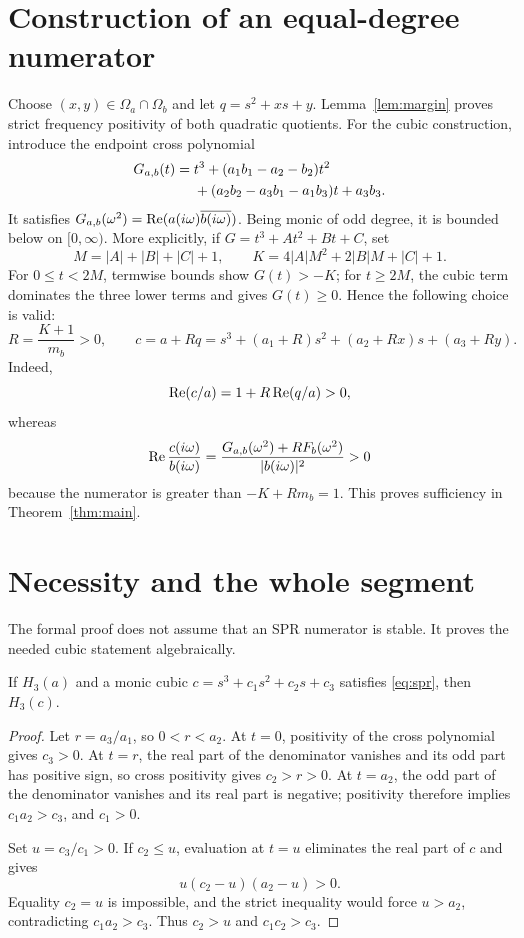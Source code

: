 \documentclass[11pt]{article}
\begin{document}
\section{Construction of an equal-degree numerator}
Choose $(x,y)\in\Omega_a\cap\Omega_b$ and let $q=s^2+xs+y$. Lemma~\ref{lem:margin} proves strict frequency positivity of both quadratic quotients. For the cubic construction, introduce the endpoint cross polynomial
\begin{align}
 G_{a,b}(t)={}&t^3+(a_1b_1-a_2-b_2)t^2\notag\\
 &+(a_2b_2-a_3b_1-a_1b_3)t+a_3b_3.
\end{align}
It satisfies $G_{a,b}(\omega^2)=\operatorname{Re}(a(i\omega)\overline{b(i\omega)})$. Being monic of odd degree, it is bounded below on $[0,\infty)$. More explicitly, if $G=t^3+At^2+Bt+C$, set
\[
 M=|A|+|B|+|C|+1,\qquad
 K=4|A|M^2+2|B|M+|C|+1.
\]
For $0\le t<2M$, termwise bounds show $G(t)>-K$; for $t\ge2M$, the cubic term dominates the three lower terms and gives $G(t)\ge0$. Hence the following choice is valid:
\begin{equation}\label{eq:R}
 R=\frac{K+1}{m_b}>0,\qquad
 c=a+Rq=s^3+(a_1+R)s^2+(a_2+Rx)s+(a_3+Ry).
\end{equation}
Indeed,
\[
 \operatorname{Re}(c/a)=1+R\operatorname{Re}(q/a)>0,
\]
whereas
\[
 \operatorname{Re}\frac{c(i\omega)}{b(i\omega)}
 =\frac{G_{a,b}(\omega^2)+R F_b(\omega^2)}{|b(i\omega)|^2}>0
\]
because the numerator is greater than $-K+Rm_b=1$. This proves sufficiency in Theorem~\ref{thm:main}.

\section{Necessity and the whole segment}
The formal proof does not assume that an SPR numerator is stable. It proves the needed cubic statement algebraically.
\begin{lemma}\label{lem:numstable}
If $H_3(a)$ and a monic cubic $c=s^3+c_1s^2+c_2s+c_3$ satisfies \eqref{eq:spr}, then $H_3(c)$.
\end{lemma}
\begin{proof}
Let $r=a_3/a_1$, so $0<r<a_2$. At $t=0$, positivity of the cross polynomial gives $c_3>0$. At $t=r$, the real part of the denominator vanishes and its odd part has positive sign, so cross positivity gives $c_2>r>0$. At $t=a_2$, the odd part of the denominator vanishes and its real part is negative; positivity therefore implies $c_1a_2>c_3$, and $c_1>0$.

Set $u=c_3/c_1>0$. If $c_2\le u$, evaluation at $t=u$ eliminates the real part of $c$ and gives
\[
 u(c_2-u)(a_2-u)>0.
\]
Equality $c_2=u$ is impossible, and the strict inequality would force $u>a_2$, contradicting $c_1a_2>c_3$. Thus $c_2>u$ and $c_1c_2>c_3$.
\end{proof}
\end{document}
